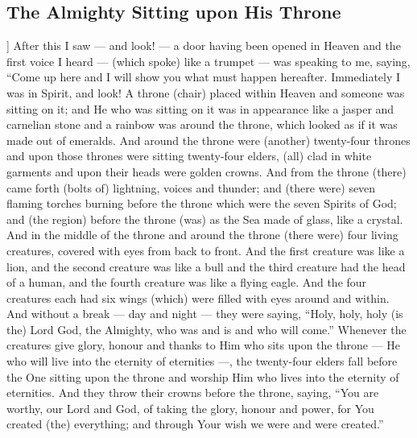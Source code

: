 \begin{pages}
\begin{Leftside}
        			\chapter{The Almighty Sitting upon His Throne}
				]
		After this I saw — and look! — a door having been opened in Heaven and the first voice I heard — (which spoke) like a trumpet — was speaking to me, saying, “Come up here and I will show you what must happen hereafter. Immediately I was in Spirit, and look! A throne (chair) placed within Heaven and someone was sitting on it; and He who was sitting on it was in appearance like a jasper and carnelian stone and a rainbow was around the throne, which looked as if it was made out of emeralds. And around the throne were (another) twenty-four thrones and upon those thrones were sitting twenty-four elders, (all) clad in white garments and upon their heads were golden crowns. And from the throne (there) came forth (bolts of) lightning, voices and thunder; and (there were) seven flaming torches burning before the throne which were the seven Spirits of God; and (the region) before the throne (was) as the Sea made of glass, like a crystal.
		\pend
		\pstart
		And in the middle of the throne and around the throne (there were) four living creatures, covered with eyes from back to front. And the first creature was like a lion, and the second creature was like a bull and the third creature had the head of a human, and the fourth creature was like a flying eagle. And the four creatures each had six wings (which) were filled with eyes around and within. And without a break — day and night — they were saying, “Holy, holy, holy (is the) Lord God, the Almighty, who was and is and who will come.”
		\pend
		\pstart
		Whenever the creatures give glory, honour and thanks to Him who sits upon the throne — He who will live into the eternity of eternities —, the twenty-four elders fall before the One sitting upon the throne and worship Him who lives into the eternity of eternities. And they throw their crowns before the throne, saying, “You are worthy, our Lord and God, of taking the glory, honour and power, for You created (the) everything; and through Your wish we were and were created.”
		\pend
        \endnumbering
    \end{Leftside}

\end{pages} 
\Pages

